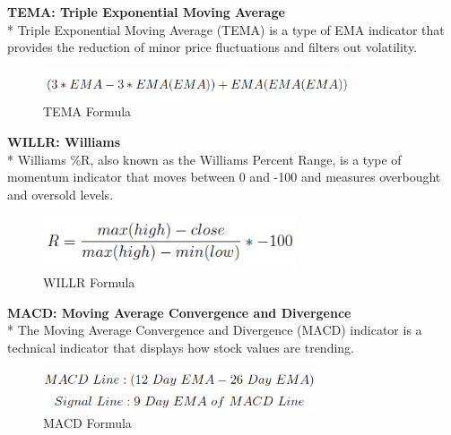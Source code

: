 \documentclass{article}
\begin{document}
\noindent
\textbf{TEMA: Triple Exponential Moving Average} \\*
Triple Exponential Moving Average (TEMA) is a type of EMA indicator that provides the reduction of minor price fluctuations and filters out volatility.
\begin{figure}[H]
\begin{center}
   \includegraphics[width=90mm,scale=0.8]{assets/formulas/tema.png}
   \caption{TEMA Formula}
\end{center}
\end{figure}
\noindent
\textbf{WILLR: Williams} \\*
Williams \%R, also known as the Williams Percent Range, is a type of momentum indicator that moves between 0 and -100 and measures overbought and oversold levels.
\begin{figure}[H]
\begin{center}
    \includegraphics[width=75mm,scale=0.8]{assets/formulas/willr.png}
    \caption{WILLR Formula}
\end{center}
\end{figure}
\noindent
\textbf{MACD: Moving Average Convergence and Divergence} \\*
The Moving Average Convergence and Divergence (MACD) indicator is a technical indicator that displays how stock values are trending.
\begin{figure}[H]
\begin{center}
    \includegraphics[width=80mm,scale=0.8]{assets/formulas/macd.png}
    \caption{MACD Formula}
\end{center}
\end{figure}
\noindent
\end{document}

